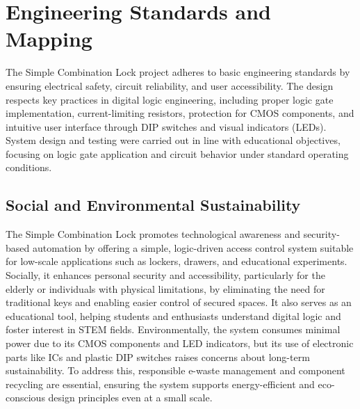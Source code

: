 \chapter{Engineering Standards and Mapping}
The Simple Combination Lock project adheres to basic engineering standards by ensuring electrical safety, circuit reliability, and user accessibility. The design respects key practices in digital logic engineering, including proper logic gate implementation, current-limiting resistors, protection for CMOS components, and intuitive user interface through DIP switches and visual indicators (LEDs). System design and testing were carried out in line with educational objectives, focusing on logic gate application and circuit behavior under standard operating conditions.

\section{Social and Environmental Sustainability}
The Simple Combination Lock promotes technological awareness and security-based automation by offering a simple, logic-driven access control system suitable for low-scale applications such as lockers, drawers, and educational experiments. Socially, it enhances personal security and accessibility, particularly for the elderly or individuals with physical limitations, by eliminating the need for traditional keys and enabling easier control of secured spaces. It also serves as an educational tool, helping students and enthusiasts understand digital logic and foster interest in STEM fields. Environmentally, the system consumes minimal power due to its CMOS components and LED indicators, but its use of electronic parts like ICs and plastic DIP switches raises concerns about long-term sustainability. To address this, responsible e-waste management and component recycling are essential, ensuring the system supports energy-efficient and eco-conscious design principles even at a small scale.\cite{4.1}


